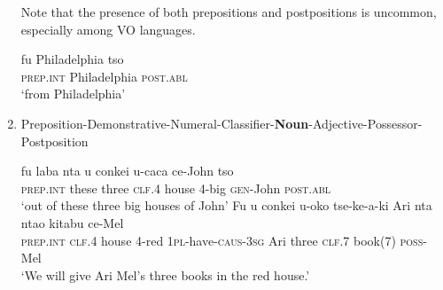 \begin{enumerate}
Note that the presence of both prepositions and postpositions is uncommon, especially among VO languages.
\begin{exe}
\ex
\gll fu Philadelphia tso \\
\textsc{prep.int} Philadelphia \textsc{post.abl} \\
\trans `from Philadelphia'
\end{exe}
\item Preposition-Demonstrative-Numeral-Classifier-\textbf{Noun}-Adjective-Possessor-Postposition
\begin{exe}
\ex
\gll fu laba nta u conkei u-caca ce-John tso \\
\textsc{prep.int} these three \textsc{clf.4} house 4-big \textsc{gen}-John \textsc{post.abl} \\
\trans `out of these three big houses of John'
\ex
\gll Fu u conkei u-\textbeltl oko tse-ke-\textbeltl a-ki Ari nta nta\textbeltl o kitabu ce-Mel \\
\textsc{prep.int} \textsc{clf.4} house 4-red \textsc{1pl}-have-\textsc{caus}-\textsc{3sg} Ari three \textsc{clf}.7 book(7) \textsc{poss}-Mel \\
\trans `We will give Ari Mel's three books in the red house.'
\end{exe}

\end{enumerate}

